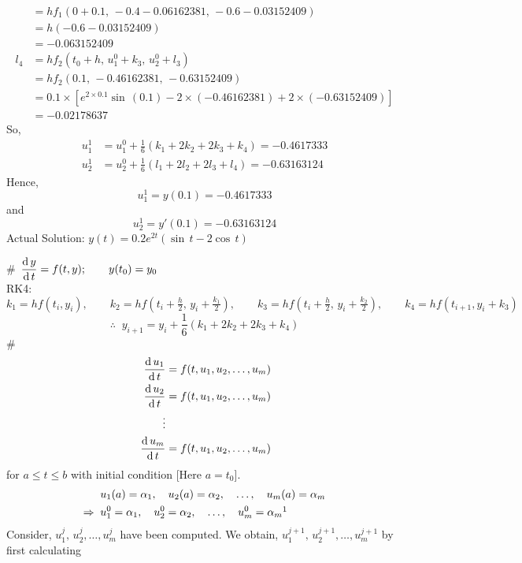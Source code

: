\documentclass[../main-sheet.tex]{subfiles}
\begin{document}
\begin{soln}
\begin{align*}
        &=hf_1\left(0+0.1,\,-0.4-0.06162381,\,-0.6-0.03152409\right)\\
        &=h\left(-0.6-0.03152409\right)\\
        &=-0.063152409\\
        l_4&=hf_2\left(t_0+h,\,u_1^0+k_3,\,u_2^0+l_3\right)\\
        &=hf_2\left(0.1,\,-0.46162381,\,-0.63152409\right)\\
        &=0.1\times\left[e^{2\times 0.1}\sin \,(0.1)-2\times(-0.46162381)+2\times(-0.63152409)\right]\\
        &=-0.02178637
    \end{align*}
    So,
    \begin{align*}
        u_1^1&=u_1^0+\frac{1}{6}(k_1+2k_2+2k_3+k_4)=-0.4617333\\
        u_2^1&=u_2^0+\frac{1}{6}(l_1+2l_2+2l_3+l_4)=-0.63163124
    \end{align*}
    Hence, \[u_1^1=y(0.1)=-0.4617333\]
    and \[u_2^1=y'(0.1)=-0.63163124\]
    Actual Solution: \(y(t)=0.2e^{2t}(\sin \,t-2\cos\,t)\)
\end{soln}
\# \(\displaystyle \,\frac{\mathrm{d}\,y}{\mathrm{d}\,t}=f(t,y); \qquad y(t_0)=y_0\)\\
RK4:
\(k_1=hf(t_i,y_i),\qquad k_2=hf\left( t_i+\frac{h}{2},\,y_i+\frac{k_1}{2} \right),\qquad k_3=hf\left( t_i+\frac{h}{2},\,y_i+\frac{k_2}{2} \right),\qquad k_4=hf(t_{i+1},y_i+k_3)\)
\[
    \therefore\;\;y_{i+1}=y_i+\frac{1}{6}(k_1+2k_2+2k_3+k_4)
\]
\# \begin{align*}
    \,\frac{\mathrm{d}\,u_1}{\mathrm{d}\,t}&=f(t,u_1,u_2,\dots,u_m)\\
    \,\frac{\mathrm{d}\,u_2}{\mathrm{d}\,t}&=f(t,u_1,u_2,\dots,u_m)\\
    \vdots&\\
    \,\frac{\mathrm{d}\,u_m}{\mathrm{d}\,t}&=f(t,u_1,u_2,\dots,u_m)
\end{align*}
for \(a\leq t\leq b\) with initial condition [Here \(a=t_0\)].
\begin{align*}
    &u_1(a)=\alpha_1,\quad u_2(a)=\alpha_2,\quad \dots,\quad u_m(a)=\alpha_m\\ 
    \Rightarrow\;\;&u_1^0=\alpha_1,\quad u_2^0=\alpha_2,\quad \dots,\quad u_m^0=\alpha_m {\footnotemark}
\end{align*}
Consider, \(u_1^j,\,u_2^j,\dots,u_m^j\) have been computed. We obtain, \(u_1^{j+1},\,u_2^{j+1},\dots,u_m^{j+1}\) by first calculating
\end{document}
